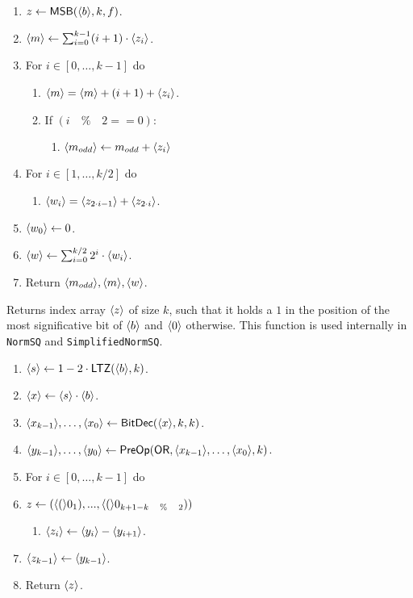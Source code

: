 \begin{enumerate}
\item $z \leftarrow \mathsf{MSB}(\langle b \rangle,k,f)$.

\item $\langle m \rangle \leftarrow \sum_{i=0}^{k-1} (i+1) \cdot \langle z_i \rangle$. 
\item For $i \in [0,\ldots,k-1]$ do
\begin{enumerate}
	\item $\langle m \rangle=\langle m \rangle+ (i+1) +\langle z_{i} \rangle$.
	\item If $(i \quad \% \quad 2 == 0)$:
	\begin{enumerate}
	    \item $\langle m_{odd} \rangle \leftarrow m_{odd} + \langle z_{i} \rangle$
	\end{enumerate}
\end{enumerate}
\item For $i \in [1,\ldots,k/2]$ do
\begin{enumerate}
	\item $\langle w_i \rangle=\langle z_{2\cdot i-1} \rangle+\langle z_{2\cdot i} \rangle$.
\end{enumerate}
\item $\langle w_0 \rangle \leftarrow 0$. 
\item $\langle w \rangle \leftarrow \sum_{i=0}^{k/2} 2^i \cdot \langle w_i \rangle$.

\item Return $\langle m_{odd} \rangle, \langle m \rangle, \langle w \rangle$.
\end{enumerate}

Returns index array $\langle z \rangle$ of size $k$, such that it holds a $1$ in the position of the most significative bit of $\langle b \rangle$ and $\langle 0 \rangle$ otherwise. This function is used internally in \verb|NormSQ| and \verb|SimplifiedNormSQ|.
\begin{enumerate}

\item $\langle s \rangle \leftarrow 1-2 \cdot \mathsf{LTZ}(\langle b \rangle,k)$.
\item $\langle x \rangle \leftarrow \langle s \rangle \cdot \langle b \rangle$.
\item $\langle x_{k-1} \rangle,\ldots,\langle x_0 \rangle \leftarrow \mathsf{BitDec}(\langle x \rangle,k,k)$.
\item $\langle y_{k-1} \rangle,\ldots,\langle y_0 \rangle \leftarrow \mathsf{PreOp}(\mathsf{OR},\langle x_{k-1} \rangle,\ldots,\langle x_0 \rangle,k)$.
\item For $i \in [0,\ldots,k-1]$ do
\item $z \leftarrow (\langle ( \rangle0_{1}),...,\langle ( \rangle0_{k + 1 - k \quad \% \quad 2}))$
\begin{enumerate}
  \item $\langle z_i \rangle \leftarrow \langle y_i \rangle-\langle y_{i+1} \rangle$.
\end{enumerate}
\item $\langle z_{k-1} \rangle \leftarrow \langle y_{k-1} \rangle$.
\item Return $\langle z \rangle$.
\end{enumerate}


